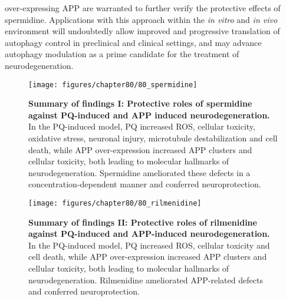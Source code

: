 over-expressing APP are warranted to further verify the protective effects of spermidine. Applications with this approach within the \textit{in vitro} and \textit{in vivo} environment will undoubtedly allow improved and progressive translation of autophagy control in preclinical and clinical settings, and may advance autophagy modulation as a prime candidate for the treatment of neurodegeneration.

\begin{landscape}
\begin{figure}[!htbp]
\vspace{2.5cm}
\center
 \texttt{[image: figures/chapter80/80\_spermidine]}
 \caption[Summary of findings I: Protective roles of spermidine against PQ-induced and APP induced neurodegeneration]{\textbf{Summary of findings I: Protective roles of spermidine against PQ-induced and APP induced neurodegeneration.}  In the PQ-induced model, PQ increased ROS, cellular toxicity, oxidative stress, neuronal injury, microtubule destabilization and cell death, while APP over-expression increased APP clusters and cellular toxicity, both leading to molecular hallmarks of neurodegeneration. Spermidine ameliorated these defects in a concentration-dependent manner and conferred neuroprotection.}
 \label{fig:80_spermidine}
\end{figure} 
\end{landscape} 
 
 \begin{landscape}
\begin{figure}[!htbp]
\vspace{3cm}
\center
 \texttt{[image: figures/chapter80/80\_rilmenidine]}
 \caption[Summary of findings II: Protective roles of rilmenidine against PQ-induced and APP-induced neurodegeneration]{\textbf{Summary of findings II: Protective roles of rilmenidine against PQ-induced and APP-induced neurodegeneration.}  In the PQ-induced model, PQ increased ROS, cellular toxicity and cell death, while APP over-expression increased APP clusters and cellular toxicity, both leading to molecular hallmarks of neurodegeneration. Rilmenidine ameliorated APP-related defects and conferred neuroprotection.}
 \label{fig:80_rilmenidine}
\end{figure} 
\end{landscape} 






















